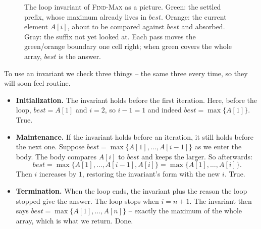 \begin{figure}[H]
\centering
{}
\caption{The loop invariant of \textsc{Find-Max} as a picture. Green: the settled
prefix, whose maximum already lives in $best$. Orange: the current element $A[i]$,
about to be compared against $best$ and absorbed. Gray: the suffix not yet looked at.
Each pass moves the green/orange boundary one cell right; when green covers the whole
array, $best$ is the answer.}
\label{ch01:invariant-regions}
\end{figure}

To use an invariant we check three things -- the same three every time, so they will
soon feel routine.

\begin{itemize}
  \item \textbf{Initialization.} The invariant holds before the first iteration.
        Here, before the loop, $best = A[1]$ and $i = 2$, so $i - 1 = 1$ and indeed
        $best = \max\{A[1]\}$. True.
  \item \textbf{Maintenance.} If the invariant holds before an iteration, it still
        holds before the next one. Suppose $best = \max\{A[1],\dots,A[i-1]\}$ as we
        enter the body. The body compares $A[i]$ to $best$ and keeps the larger.
        So afterwards:
\[ best = \max\{A[1],\dots,A[i-1], A[i]\} = \max\{A[1],\dots,A[i]\}. \]
        Then $i$ increases by $1$, restoring the invariant's form with the new $i$.
        True.
  \item \textbf{Termination.} When the loop ends, the invariant plus the reason the
        loop stopped give the answer. The loop stops when $i = n + 1$. The invariant
        then says $best = \max\{A[1], \dots, A[n]\}$ -- exactly the maximum of the
        whole array, which is what we return. Done.
\end{itemize}

